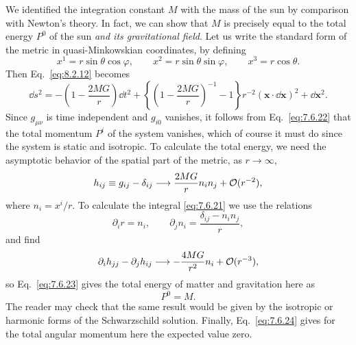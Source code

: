 We identified the integration constant \(M\) with the mass of the sun by
comparison with Newton's theory. In fact, we can show that \(M\) is
precisely equal to the total energy \(P^0\) of the sun \emph{and its
gravitational field}. Let us write the standard form of the metric in
quasi-Minkowskian coordinates, by defining
\[
  x^1=r\sin\theta\cos\varphi,\qquad
  x^2=r\sin\theta\sin\varphi,\qquad
  x^3=r\cos\theta.
\]
Then Eq.~\eqref{eq:8.2.12} becomes
\[
  \dd s^2
  =
  -\left(1-\frac{2MG}{r}\right)\dd t^2
  +\left\{
    \left(1-\frac{2MG}{r}\right)^{-1}-1
  \right\}r^{-2}(\mathbf{x}\cdot \dd\mathbf{x})^2
  +\dd\mathbf{x}^2.
\]
Since \(g_{\mu\nu}\) is time independent and \(g_{i0}\) vanishes, it
follows from Eq.~\eqref{eq:7.6.22} that the total momentum \(P^i\) of the
system vanishes, which of course it must do since the system is static and
isotropic. To calculate the total energy, we need the asymptotic behavior of
the spatial part of the metric, as \(r\to\infty\),
\[
  h_{ij}\equiv g_{ij}-\delta_{ij}
  \longrightarrow
  \frac{2MG}{r}n_i n_j+\mathcal{O}(r^{-2}),
\]
where \(n_i=x^i/r\). To calculate the integral \eqref{eq:7.6.21} we use
the relations
\[
  \partial_i r=n_i,
  \qquad
  \partial_j n_i=\frac{\delta_{ij}-n_i n_j}{r},
\]
and find
\[
  \partial_i h_{jj}-\partial_j h_{ij}
  \longrightarrow
  -\frac{4MG}{r^2}n_i+\mathcal{O}(r^{-3}),
\]
so Eq.~\eqref{eq:7.6.23} gives the total energy of matter and gravitation
here as
\begin{equation}
  P^0=M.
  \tag{8.2.16}\label{eq:8.2.16}
\end{equation}
The reader may check that the same result would be given by the isotropic or
harmonic forms of the Schwarzschild solution. Finally,
Eq.~\eqref{eq:7.6.24} gives for the total angular momentum here the
expected value zero.
